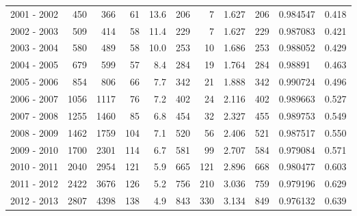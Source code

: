 \begin{tabular}{lrrrrrrrllr}
2001 - 2002 &      450 &      366 &                61 &              13.6 &                     206 &                          7 &       1.627 &           206 &   0.984547 &             0.418 \\
2002 - 2003 &      509 &      414 &                58 &              11.4 &                     229 &                          7 &       1.627 &           229 &   0.987083 &             0.421 \\
2003 - 2004 &      580 &      489 &                58 &              10.0 &                     253 &                         10 &       1.686 &           253 &   0.988052 &             0.429 \\
2004 - 2005 &      679 &      599 &                57 &               8.4 &                     284 &                         19 &       1.764 &           284 &    0.98891 &             0.463 \\
2005 - 2006 &      854 &      806 &                66 &               7.7 &                     342 &                         21 &       1.888 &           342 &   0.990724 &             0.496 \\
2006 - 2007 &     1056 &     1117 &                76 &               7.2 &                     402 &                         24 &       2.116 &           402 &   0.989663 &             0.527 \\
2007 - 2008 &     1255 &     1460 &                85 &               6.8 &                     454 &                         32 &       2.327 &           455 &   0.989753 &             0.549 \\
2008 - 2009 &     1462 &     1759 &               104 &               7.1 &                     520 &                         56 &       2.406 &           521 &   0.987517 &             0.550 \\
2009 - 2010 &     1700 &     2301 &               114 &               6.7 &                     581 &                         99 &       2.707 &           584 &   0.979084 &             0.571 \\
2010 - 2011 &     2040 &     2954 &               121 &               5.9 &                     665 &                        121 &       2.896 &           668 &   0.980477 &             0.603 \\
2011 - 2012 &     2422 &     3676 &               126 &               5.2 &                     756 &                        210 &       3.036 &           759 &   0.979196 &             0.629 \\
2012 - 2013 &     2807 &     4398 &               138 &               4.9 &                     843 &                        330 &       3.134 &           849 &   0.976132 &             0.639 \\

\end{tabular}
